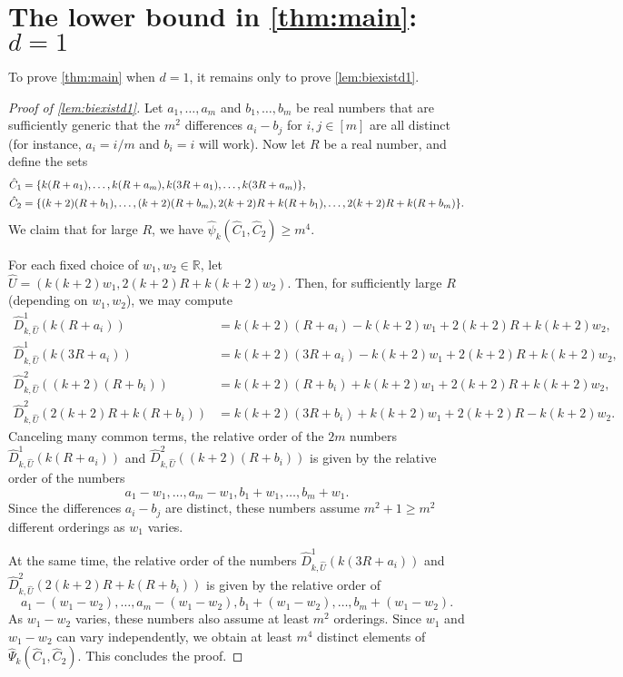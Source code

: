 \documentclass[11pt]{amsart}
\theoremstyle{definition}
\DeclarePairedDelimiter{\set}{\{}{\}}
\newcommand{\RR}{\mathbb{R}}
\begin{document}
\section{The lower bound in \texorpdfstring{\cref{thm:main}}{Theorem \ref{thm:main}}: \texorpdfstring{$d = 1$}{d = 1}} \label{sec:lowerd1}
To prove \cref{thm:main} when $d=1$, it remains only to prove \cref{lem:biexistd1}.
\begin{proof}[Proof of \cref{lem:biexistd1}]
Let $a_1,\ldots,a_m$ and $b_1,\ldots,b_m$ be real numbers that are sufficiently generic that the $m^2$ differences $a_i - b_j$ for $i, j \in [m]$ are all distinct (for instance, $a_i = i/m$ and $b_i = i$ will work). Now let $R$ be a real number, and define the sets
\begin{align*}
\hat C_1 &= \set{k(R+a_1),\ldots,k(R+a_m),k(3R + a_1),\ldots,k(3R + a_m)}, \\
\hat C_2 &= \set{(k+2)(R+b_1),\ldots,(k+2)(R+b_m),2(k+2)R+k(R+b_1),\ldots,2(k+2)R+k(R+b_m)}.
\end{align*}
We claim that for large $R$, we have $\hat \psi_k(\hat C_1, \hat C_2) \geq m^4$.

For each fixed choice of $w_1,w_2 \in \RR$, let $\hat U = (k(k+2)w_1, 2(k+2)R+k(k+2)w_2)$. Then, for sufficiently large $R$ (depending on $w_1,w_2$), we may compute
\begin{align*}
\hat D^1_{k,\hat U}(k(R + a_i)) &= k(k+2)(R + a_i)-k(k+2)w_1+2(k+2)R+k(k+2)w_2, \\
\hat D^1_{k,\hat U}(k(3R + a_i)) &= k(k+2)(3R + a_i)-k(k+2)w_1+2(k+2)R+k(k+2)w_2, \\
\hat D^2_{k,\hat U}((k+2)(R + b_i)) &= k(k+2)(R + b_i)+k(k+2)w_1+2(k+2)R+k(k+2)w_2, \\
\hat D^2_{k,\hat U}(2(k+2)R+k(R+b_i)) &= k(k+2)(3R + b_i)+k(k+2)w_1+2(k+2)R-k(k+2)w_2.
\end{align*}
Canceling many common terms, the relative order of the $2m$ numbers $\hat D^1_{k,\hat U}(k(R + a_i))$ and ${\hat D^2_{k,\hat U}((k+2)(R + b_i))}$ is given by the relative order of the numbers
\[a_1 - w_1, \ldots, a_m - w_1, b_1 + w_1, \ldots, b_m + w_1.\]
Since the differences $a_i - b_j$ are distinct, these numbers assume $m^2 + 1 \geq m^2$ different orderings as $w_1$ varies.

At the same time, the relative order of the numbers $\hat D^1_{k,\hat U}(k(3R + a_i))$ and $\hat D^2_{k,\hat U}(2(k+2)R+k(R+b_i))$ is given by the relative order of
\[a_1 - (w_1 - w_2), \ldots, a_m - (w_1 - w_2), b_1 + (w_1 - w_2),\ldots, b_m + (w_1 - w_2).\]
As $w_1 - w_2$ varies, these numbers also assume at least $m^2$ orderings. Since $w_1$ and $w_1 - w_2$ can vary independently, we obtain at least $m^4$ distinct elements of $\hat \Psi_k(\hat C_1, \hat C_2)$.  This concludes the proof.
\end{proof}
\end{document}

